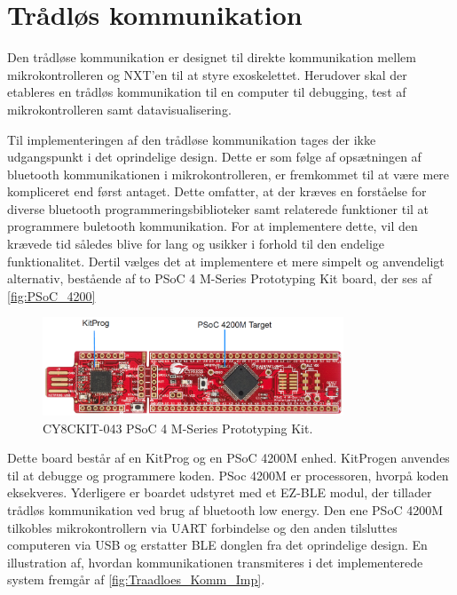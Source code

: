 \section{Trådløs kommunikation}
Den trådløse kommunikation er designet til direkte kommunikation mellem mikrokontrolleren og NXT'en til at styre exoskelettet. Herudover skal der etableres en trådløs kommunikation til en computer til debugging, test af mikrokontrolleren samt datavisualisering.   

\noindent
Til implementeringen af den trådløse kommunikation tages der ikke udgangspunkt i det oprindelige design. Dette er som følge af opsætningen af bluetooth kommunikationen i mikrokontrolleren, er fremkommet til at være mere kompliceret end først antaget. Dette omfatter, at der kræves en forståelse for diverse bluetooth programmeringsbiblioteker samt relaterede funktioner til at programmere buletooth kommunikation. For at implementere dette, vil den krævede tid således blive for lang og usikker i forhold til den endelige funktionalitet.
Dertil vælges det at implementere et mere simpelt og anvendeligt alternativ, bestående af to PSoC 4 M-Series Prototyping Kit board, der ses af \autoref{fig:PSoC_4200}

\begin{figure}[H]
	\centering
	\includegraphics[width=0.8\textwidth]{figures/PSoC_4200_opdelt}
	\caption{CY8CKIT-043 PSoC 4 M-Series Prototyping Kit\citep{cypress42015}.}
	\label{fig:PSoC_4200}
\end{figure}

Dette board består af en KitProg og en PSoC 4200M enhed. KitProgen anvendes til at debugge og programmere koden. PSoc 4200M er processoren, hvorpå koden eksekveres. Yderligere er boardet udstyret med et EZ-BLE modul, der tillader trådløs kommunikation ved brug af bluetooth low energy. 
Den ene PSoC 4200M tilkobles mikrokontrollern via UART forbindelse og den anden tilsluttes computeren via USB og erstatter BLE donglen fra det oprindelige design. En illustration af, hvordan kommunikationen transmiteres i det implementerede system fremgår af \autoref{fig:Traadloes_Komm_Imp}.

